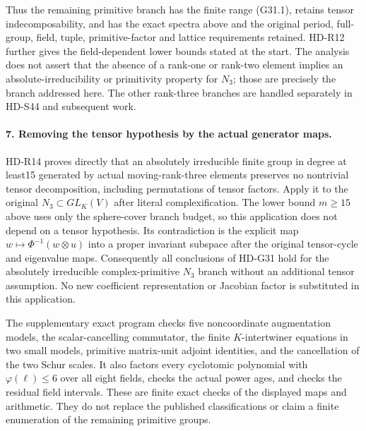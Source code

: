Thus the remaining primitive branch has the finite range
(G31.1), retains tensor indecomposability, and has the exact spectra
above and the original period, full-group, field, tuple,
primitive-factor and lattice requirements retained.  HD-R12
further gives the field-dependent lower bounds stated at the
start.  The analysis does not assert that the absence of a
rank-one or rank-two element implies an absolute-irreducibility
or primitivity property for $N_3$; those are precisely the
branch addressed here.  The other rank-three branches are
handled separately in HD-S44 and subsequent work.

\paragraph{7. Removing the tensor hypothesis by the actual generator maps.}
HD-R14 proves directly that an absolutely irreducible finite group
in degree at least15 generated by actual moving-rank-three
elements preserves no nontrivial tensor decomposition, including
permutations of tensor factors.  Apply it to the original
$N_3\subset GL_K(V)$ after literal complexification.  The lower
bound $m\ge15$ above uses only the sphere-cover branch budget,
so this application does not depend on a tensor hypothesis.
Its contradiction is the explicit map
$w\mapsto\Phi^{-1}(w\otimes u)$ into a proper invariant
subspace after the original tensor-cycle and eigenvalue maps.
Consequently all conclusions of HD-G31 hold for the absolutely
irreducible complex-primitive $N_3$ branch without an additional
tensor assumption.  No new coefficient representation or
Jacobian factor is substituted in this application.

The supplementary exact program checks five noncoordinate
augmentation models, the scalar-cancelling commutator, the
finite $K$-intertwiner equations in two small models, primitive
matrix-unit adjoint identities, and the cancellation of the two
Schur scales.  It also factors every cyclotomic polynomial with
$\varphi(\ell)\le6$ over all eight fields, checks the actual
power ages, and checks the residual field intervals.  These are
finite exact checks of the displayed maps and arithmetic.  They
do not replace the published classifications or claim a finite
enumeration of the remaining primitive groups.
